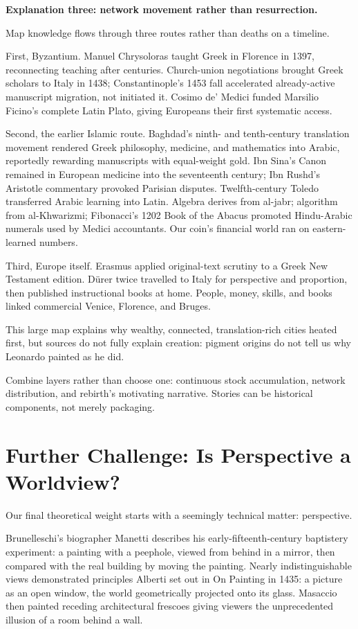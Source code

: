 \textbf{Explanation three: network movement rather than resurrection.}

Map knowledge flows through three routes rather than deaths on a timeline.

First, Byzantium. Manuel Chrysoloras taught Greek in Florence in 1397, reconnecting teaching after centuries. Church-union negotiations brought Greek scholars to Italy in 1438; Constantinople's 1453 fall accelerated already-active manuscript migration, not initiated it. Cosimo de' Medici funded Marsilio Ficino's complete Latin Plato, giving Europeans their first systematic access.

Second, the earlier Islamic route. Baghdad's ninth- and tenth-century translation movement rendered Greek philosophy, medicine, and mathematics into Arabic, reportedly rewarding manuscripts with equal-weight gold. Ibn Sina's Canon remained in European medicine into the seventeenth century; Ibn Rushd's Aristotle commentary provoked Parisian disputes. Twelfth-century Toledo transferred Arabic learning into Latin. Algebra derives from al-jabr; algorithm from al-Khwarizmi; Fibonacci's 1202 Book of the Abacus promoted Hindu-Arabic numerals used by Medici accountants. Our coin's financial world ran on eastern-learned numbers.

Third, Europe itself. Erasmus applied original-text scrutiny to a Greek New Testament edition. Dürer twice travelled to Italy for perspective and proportion, then published instructional books at home. People, money, skills, and books linked commercial Venice, Florence, and Bruges.

This large map explains why wealthy, connected, translation-rich cities heated first, but sources do not fully explain creation: pigment origins do not tell us why Leonardo painted as he did.

Combine layers rather than choose one: continuous stock accumulation, network distribution, and rebirth's motivating narrative. Stories can be historical components, not merely packaging.

\section[Further Challenge: Perspective]{Further Challenge: Is Perspective a Worldview?}
Our final theoretical weight starts with a seemingly technical matter: perspective.

Brunelleschi's biographer Manetti describes his early-fifteenth-century baptistery experiment: a painting with a peephole, viewed from behind in a mirror, then compared with the real building by moving the painting. Nearly indistinguishable views demonstrated principles Alberti set out in On Painting in 1435: a picture as an open window, the world geometrically projected onto its glass. Masaccio then painted receding architectural frescoes giving viewers the unprecedented illusion of a room behind a wall.

